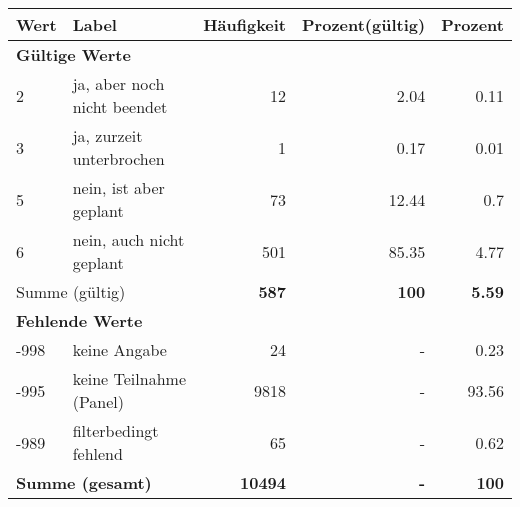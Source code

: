      \begin{longtable}{lXrrr}
     \toprule
     \textbf{Wert} & \textbf{Label} & \textbf{Häufigkeit} & \textbf{Prozent(gültig)} & \textbf{Prozent} \\
     \endhead
     \midrule
     \multicolumn{5}{l}{\textbf{Gültige Werte}}\\

     2 &
     \multicolumn{1}{X}{ ja, aber noch nicht beendet   } &


       \num{12} &
       \num[round-mode=places,round-precision=2]{2,04} &
         \num[round-mode=places,round-precision=2]{0,11} \\

     3 &
     \multicolumn{1}{X}{ ja, zurzeit unterbrochen   } &


       \num{1} &
       \num[round-mode=places,round-precision=2]{0,17} &
         \num[round-mode=places,round-precision=2]{0,01} \\

     5 &
     \multicolumn{1}{X}{ nein, ist aber geplant   } &


       \num{73} &
       \num[round-mode=places,round-precision=2]{12,44} &
         \num[round-mode=places,round-precision=2]{0,7} \\

     6 &
     \multicolumn{1}{X}{ nein, auch nicht geplant   } &


       \num{501} &
       \num[round-mode=places,round-precision=2]{85,35} &
         \num[round-mode=places,round-precision=2]{4,77} \\
     \midrule
     \multicolumn{2}{l}{Summe (gültig)} &
       \textbf{\num{587}} &
     \textbf{100} &
       \textbf{\num[round-mode=places,round-precision=2]{5,59}} \\
     \multicolumn{5}{l}{\textbf{Fehlende Werte}}\\
       -998 &
       keine Angabe &
         \num{24} &
        - &
         \num[round-mode=places,round-precision=2]{0,23} \\
       -995 &
       keine Teilnahme (Panel) &
         \num{9818} &
        - &
         \num[round-mode=places,round-precision=2]{93,56} \\
       -989 &
       filterbedingt fehlend &
         \num{65} &
        - &
         \num[round-mode=places,round-precision=2]{0,62} \\
     \midrule
     \multicolumn{2}{l}{\textbf{Summe (gesamt)}} &
          \textbf{\num{10494}} &
        \textbf{-} &
        \textbf{100} \\
     \bottomrule
     \end{longtable}
     
